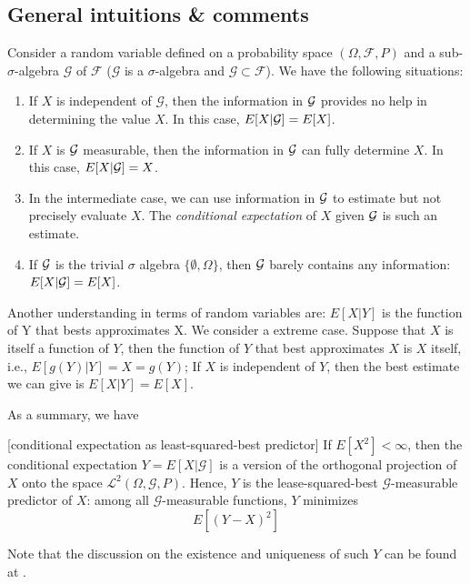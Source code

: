 \begin{refsection}
\subsection{General intuitions \& comments}
Consider a random variable defined on a probability space $(\Omega,\mathcal{F},P)$ and a sub-$\sigma$-algebra $\mathcal{G}$ of $\mathcal{F}$ ($\mathcal{G}$ is a $\sigma$-algebra and $\mathcal{G}\subset \mathcal{F}$). We have the following situations:\cite{shreve2004stochastic2}
\begin{enumerate}
    \item If $X$ is independent of $\mathcal{G}$, then the information in $\mathcal{G}$ provides no help in determining the value $X$. In this case, $E[X|\mathcal{G}]=E[X]$.
    \item If $X$ is $\mathcal{G}$ measurable, then the information in $\mathcal{G}$ can fully determine $X$. In this case, $E[X|\mathcal{G}]=X$.
    \item In the intermediate case, we can use information in $\mathcal{G}$ to estimate but not precisely evaluate $X$. The \emph{conditional expectation} of $X$ given $\mathcal{G}$ is such an estimate. 
    \item If $\mathcal{G}$ is the trivial $\sigma$ algebra $\{\emptyset,\Omega\}$, then $\mathcal{G}$ barely contains any information: $E[X|\mathcal{G}] = E[X]$.
\end{enumerate}

Another understanding in terms of random variables are: $E[X|Y]$ is the function of Y that bests approximates X.  We consider a extreme case. Suppose that $X$ is itself a function of $Y$, then the function of $Y$ that
best approximates $X$ is $X$ itself, i.e., $E[g(Y)|Y]=X=g(Y)$; If $X$ is independent of $Y$, then the best estimate we can give is $E[X|Y]=E[X]$.

As a summary, we have
\begin{lemma}\cite{williams1991probability}
[conditional expectation as least-squared-best predictor] If $E[X^2] < \infty$, then the conditional expectation $Y=E[X|\mathcal{G}]$ is a version of the orthogonal projection of $X$ onto the space $\mathcal{L}^2(\Omega, \mathcal{G},P).$ Hence, $Y$ is the lease-squared-best $\mathcal{G}$-measurable predictor of $X$: among all $\mathcal{G}$-measurable functions, $Y$ minimizes 
$$E[(Y-X)^2]$$
\end{lemma}

\begin{remark}
Note that the discussion on the existence and uniqueness of such $Y$ can be found at \cite{williams1991probability}\cite[28]{mikosch1998elementary}.	
\end{remark}


\end{refsection}
